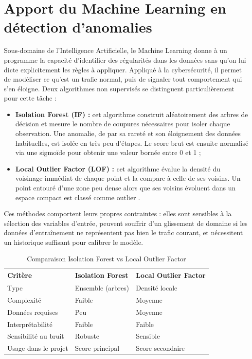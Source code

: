 \documentclass[12pt,a4paper]{report}
\begin{document}
\section{Apport du Machine Learning en détection d'anomalies}
\begin{onehalfspace}
Sous-domaine de l'Intelligence Artificielle, le Machine Learning donne à un
programme la capacité d'identifier des régularités dans les données sans qu'on
lui dicte explicitement les règles à appliquer. Appliqué à la cybersécurité,
il permet de modéliser ce qu'est un trafic normal, puis de signaler tout
comportement qui s'en éloigne. Deux algorithmes non supervisés se distinguent
particulièrement pour cette tâche :

\begin{itemize}
  \item[\ding{43}] \textbf{Isolation Forest (IF) :} cet algorithme construit
  aléatoirement des arbres de décision et mesure le nombre de coupures
  nécessaires pour isoler chaque observation. Une anomalie, de par sa rareté
  et son éloignement des données habituelles, est isolée en très peu d'étapes.
  Le score brut est ensuite normalisé via une sigmoïde pour obtenir une valeur
  bornée entre 0 et 1 \cite{liu2008isolation} ;
  \item[\ding{43}] \textbf{Local Outlier Factor (LOF) :} cet algorithme
  évalue la densité du voisinage immédiat de chaque point et la compare à
  celle de ses voisins. Un point entouré d'une zone peu dense alors que ses
  voisins évoluent dans un espace compact est classé comme outlier
  \cite{breunig2000lof}.
\end{itemize}

Ces méthodes comportent leurs propres contraintes : elles sont sensibles à la
sélection des variables d'entrée, peuvent souffrir d'un glissement de domaine
si les données d'entraînement ne représentent pas bien le trafic courant, et
nécessitent un historique suffisant pour calibrer le modèle.
\end{onehalfspace}

\begin{table}[H]
\centering
\caption{Comparaison Isolation Forest vs Local Outlier Factor}
\label{tab:if_lof_comparaison}
\begin{tabular}{|p{4cm}|p{5cm}|p{5cm}|}
\hline
\textbf{Critère} & \textbf{Isolation Forest} & \textbf{Local Outlier Factor} \\
\hline
Type & Ensemble (arbres) & Densité locale \\
\hline
Complexité & Faible & Moyenne \\
\hline
Données requises & Peu & Moyenne \\
\hline
Interprétabilité & Faible & Faible \\
\hline
Sensibilité au bruit & Robuste & Sensible \\
\hline
Usage dans le projet & Score principal & Score secondaire \\
\hline
\end{tabular}
\end{table}
\end{document}
